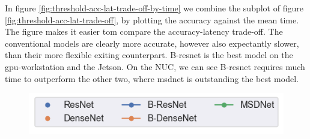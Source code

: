 In figure \ref{fig:threshold-acc-lat-trade-off-by-time} we combine the subplot of figure \ref{fig:threshold-acc-lat-trade-off}, by plotting the accuracy against the mean time. The figure makes it easier tom compare the accuracy-latency trade-off. The conventional models are clearly more accurate, however also expectantly slower, than their more flexible exiting counterpart. B-\gls{resnet} is the best model on the \gls{gpu}-workstation and the Jetson. On the NUC, we can see B-\gls{resnet} requires much time to outperform the other two, where \gls{msdnet} is outstanding the best model. 

\begin{figure}
	\captionsetup[subfigure]{justification=centering,farskip=0pt,captionskip=0pt}
	\centering
	\includegraphics[width=.4\linewidth]{figures/threshold_plots/inference_by_time_legend}
	\hfill
	\hfill

\end{figure}
